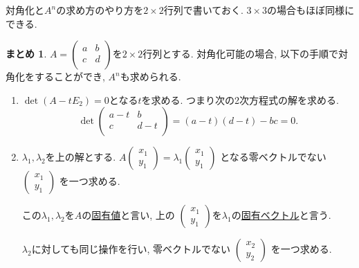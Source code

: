 \documentclass[dvipdfmx,a4paper,11pt]{article} %
\theoremstyle{definition}
\newtheorem{suma}[thm]{まとめ}
\begin{document}
対角化と$A^n$の求め方のやり方を$2 \times 2$行列で書いておく. 
$3 \times 3$の場合もほぼ同様にできる. 
  \begin{suma}
$A=\begin{pmatrix}
a& b \\
c& d \\
\end{pmatrix}$を$2 \times 2$行列とする.
 対角化可能の場合, 以下の手順で対角化をすることができ, $A^n$も求められる.  
\begin{enumerate}
	\setlength{\parskip}{0cm}
  	\setlength{\itemsep}{0pt} 
\item[手順1.] $\det (A - tE_2) =0$となる$t$を求める. つまり次の2次方程式の解を求める.
$$
\det
\begin{pmatrix}
a-t& b \\
c& d -t\\
\end{pmatrix}
= (a-t)(d-t) -bc=0.
$$
\item[手順2.] $\lambda_1, \lambda_2$を上の解とする. 
$
A\begin{pmatrix}
x_1 \\ y_1
 \end{pmatrix}  
 = 
 \lambda_1
 \begin{pmatrix}
x_1 \\ y_1
 \end{pmatrix}  
$
となる零ベクトルでない
$ \begin{pmatrix}
x_1 \\ y_1
 \end{pmatrix}  
 $
 を一つ求める. 
 
 この$\lambda_1, \lambda_2$を$A$の\underline{固有値}と言い, 上の
 $ \begin{pmatrix}
x_1 \\ y_1
 \end{pmatrix}  
 $を$\lambda_1$の\underline{固有ベクトル}と言う.
 
 $\lambda_2$に対しても同じ操作を行い, 零ベクトルでない
$ \begin{pmatrix}
x_2 \\ y_2
 \end{pmatrix}  
 $
 を一つ求める. 
 

\end{enumerate}
\end{suma}
\end{document}
